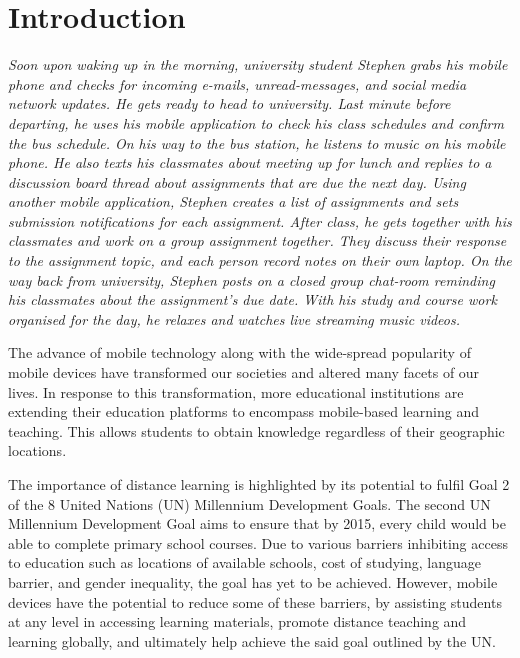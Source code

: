 
\chapter{Introduction}\label{C:intro}

\begin{addmargin}[2.5em]{0em}%
\textit {Soon upon waking up in the morning, university student Stephen grabs his mobile phone and checks for incoming e-mails, unread-messages, and social media network updates. He gets ready to head to university. Last minute 	before departing, he uses his mobile application to check his class schedules and confirm the bus schedule. On his way to the bus station, he listens to music on his mobile phone. He also texts his classmates about meeting up for lunch and replies to a discussion board thread about assignments that are due the next day. Using another mobile application, Stephen creates a list of assignments and sets submission notifications for each assignment. After class, he gets together with his classmates and work on a group assignment together. They discuss their response to the assignment topic, and each person record notes on their own laptop. On the way back from university, Stephen 	posts on a closed group chat-room reminding his classmates about the 	assignment's due date. With his study and course work organised for the day, he relaxes and watches live streaming music videos.}
\end{addmargin}
\hfill

\noindent The advance of mobile technology along with the wide-spread popularity of mobile devices have transformed our societies and altered many facets of our lives.  In response to this transformation, more educational institutions are extending their education platforms to encompass mobile-based learning and teaching. This allows students to obtain knowledge regardless of their geographic locations. 

The importance of distance learning is highlighted by its potential to fulfil Goal 2 of the 8 United Nations (UN) Millennium Development Goals. The second UN Millennium Development Goal aims to ensure that by 2015, every child would be able to complete primary school courses. Due to various barriers inhibiting access to education such as locations of available schools, cost of studying, language barrier, and gender inequality, the goal has yet to be achieved. However, mobile devices have the potential to reduce some of these barriers, by assisting students at any level in accessing learning materials, promote distance teaching and learning globally, and ultimately help achieve the said goal outlined by the UN.

